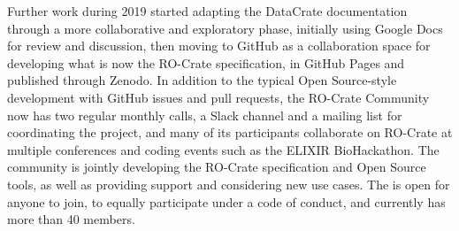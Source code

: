 {}Further work during 2019 started adapting the DataCrate documentation through a more collaborative and exploratory  phase, initially using Google Docs for review and discussion, then moving to GitHub as a collaboration space for developing what is now the RO-Crate specification,  in GitHub Pages and published through Zenodo. \markdownRendererInterblockSeparator
{}In addition to the typical Open Source-style development with GitHub issues and pull requests, the RO-Crate Community now has two regular monthly calls, a Slack channel and a mailing list for coordinating the project, and many of its participants collaborate on RO-Crate at multiple conferences and coding events such as the ELIXIR BioHackathon. The community is jointly developing the RO-Crate specification and Open Source tools, as well as providing support and considering new use cases. The  is open for anyone to join, to equally participate under a code of conduct, and currently has more than 40 members. \relax